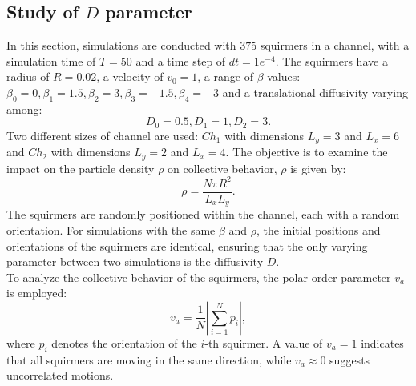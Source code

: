 \documentclass{article}
\begin{document}
\subsection{Study of $D$ parameter}
In this section, simulations are conducted with $375$ squirmers in a channel, with a simulation time of $T=50$ and a time step of $dt=1e^{-4}$. 
The squirmers have 
a radius of $R = 0.02$, a velocity of $v_0 = 1$, a range of $\beta$ values:
$\beta_0 = 0, \beta_1 = 1.5, \beta_2 = 3, \beta_3 = -1.5, \beta_4 = -3$
 and a translational diffusivity varying among:
$$D_0 = 0.5, D_1 = 1, D_2 = 3.$$
Two different sizes of channel are used: $Ch_1$ with dimensions $L_y = 3$ and $L_x = 6$ and $Ch_2$ with dimensions $L_y=2$ and $L_x=4$. 
The objective is to examine 
the impact on the particle density $\rho$ on collective behavior, $\rho$ is given by:
$$\rho = \frac{N\pi R^2}{L_xL_y}.$$
The squirmers are randomly positioned within the channel, each with a random orientation.
For simulations with the same $\beta$ and $\rho$, the initial positions and orientations of the squirmers are identical,
ensuring that the only varying parameter between two simulations is the diffusivity $D$.\\
To analyze the collective behavior of the squirmers, the polar order parameter $v_a$ is employed:
$$v_a = \frac{1}{N}\left|\sum^{N}_{i=1}p_i\right|,$$
where $p_i$ denotes the orientation of the $i$-th squirmer.
A value of $v_a = 1$ indicates that all squirmers are moving in the same direction, while $v_a\approx 0$ suggests uncorrelated motions.
\end{document}
